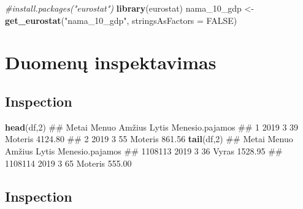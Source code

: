 \documentclass[]{article}
\newenvironment{Shaded}{\begin{snugshade}}{\end{snugshade}}
\newcommand{\KeywordTok}[1]{\textcolor[rgb]{0.13,0.29,0.53}{\textbf{#1}}}
\newcommand{\DataTypeTok}[1]{\textcolor[rgb]{0.13,0.29,0.53}{#1}}
\newcommand{\DecValTok}[1]{\textcolor[rgb]{0.00,0.00,0.81}{#1}}
\newcommand{\StringTok}[1]{\textcolor[rgb]{0.31,0.60,0.02}{#1}}
\newcommand{\CommentTok}[1]{\textcolor[rgb]{0.56,0.35,0.01}{\textit{#1}}}
\newcommand{\OtherTok}[1]{\textcolor[rgb]{0.56,0.35,0.01}{#1}}
\newcommand{\NormalTok}[1]{#1}
\begin{document}
\begin{Shaded}
\begin{Highlighting}[]
\CommentTok{#install.packages("eurostat")}
\KeywordTok{library}\NormalTok{(eurostat)}
\NormalTok{nama_10_gdp <-}\StringTok{ }\KeywordTok{get_eurostat}\NormalTok{(}\StringTok{"nama_10_gdp"}\NormalTok{, }\DataTypeTok{stringsAsFactors =} \OtherTok{FALSE}\NormalTok{)}
\end{Highlighting}
\end{Shaded}

\section{Duomenų inspektavimas}\label{duomenu-inspektavimas}

\subsection{Inspection}\label{inspection}

\begin{Shaded}
\begin{Highlighting}[]
\KeywordTok{head}\NormalTok{(df,}\DecValTok{2}\NormalTok{)}
\NormalTok{##   Metai Menuo Amžius   Lytis Menesio.pajamos}
\NormalTok{## 1  2019     3     39 Moteris         4124.80}
\NormalTok{## 2  2019     3     55 Moteris          861.56}
\KeywordTok{tail}\NormalTok{(df,}\DecValTok{2}\NormalTok{)}
\NormalTok{##         Metai Menuo Amžius   Lytis Menesio.pajamos}
\NormalTok{## 1108113  2019     3     36   Vyras         1528.95}
\NormalTok{## 1108114  2019     3     65 Moteris          555.00}
\end{Highlighting}
\end{Shaded}

\subsection{Inspection}\label{inspection-1}

\begin{Shaded}
\end{Shaded}
\end{document}
